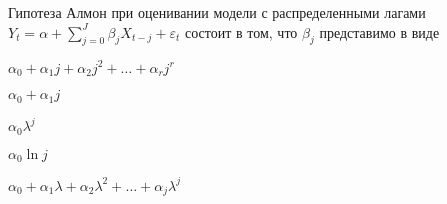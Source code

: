
\begin{question}
Гипотеза Алмон при оценивании модели с распределенными лагами
\(Y_t = \alpha + \sum_{j=0}^J\beta_j X_{t-j} + \varepsilon_t\) состоит в
том, что \(\beta_j\) представимо в виде
\begin{answerlist}
  \item \(\alpha_0 + \alpha_1 j + \alpha_2 j^2 + \ldots + \alpha_r j^r\)
  \item \(\alpha_0 + \alpha_1 j\)
  \item \(\alpha_0 \lambda^j\)
  \item \(\alpha_0 \ln j\)
  \item \(\alpha_0 + \alpha_1 \lambda + \alpha_2 \lambda^2 +\ldots + \alpha_j \lambda^j\)
\end{answerlist}
\end{question}



